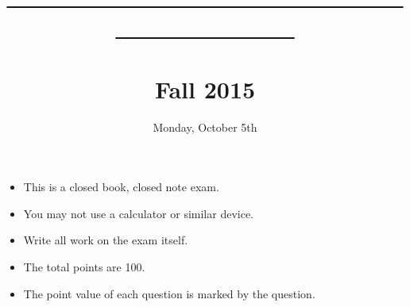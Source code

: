 \documentclass[12pt]{article}
\begin{document}
\title{\underline{~~~~~~~~~~~~~~~~~~~~~~~~~~~~~~~~~~~~~~~~~~~~~}
\\
\vspace{20ex}{\bf CS8440 Midterm Examination}\\{\bf Fall 2015}
}
\date{Monday, October 5th}

\maketitle
\thispagestyle{empty}

{\large
\begin{center}
\begin{minipage}{4.5in}
\begin{itemize}
\item This is a closed book, closed note exam. 
\item You may not use a calculator or similar device.
\item Write all work on the exam itself. 
\item The total points are 100.
\item The point value of each question is marked by the question.
\end{itemize}
\end{minipage}
\end{center}
}                         


\newpage



\end{document}
